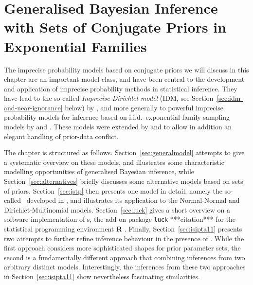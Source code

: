 \chapter{Generalised Bayesian Inference with Sets of Conjugate Priors in Exponential Families}
\label{cha:imprecisebayes-conjugate}

The imprecise probability models based on conjugate priors we will discuss in this chapter
are an important model class,
and have been central to the development and application of imprecise probability methods
in statistical inference.
They have lead to the so-called \emph{Imprecise Dirichlet model} (IDM, see Section~\ref{sec:idm-and-near-ignorance} below)
by \textcite{1996:walley::idm}, %
and more generally to powerful imprecise probability models for inference
based on i.i.d.\ exponential family sampling models by \textcite{2005:quaeghebeurcooman} and \textcite{2009:quaeghebeur::phd}.
These models were extended by \textcite[see Section~\ref{sec:jstp}]{Walter2009a} and \textcite[see Section~\ref{sec:isipta11}]{Walter2011a}
to allow in addition an elegant handling of prior-data conflict.

\medskip

The chapter is structured as follows.
Section~\ref{sec:generalmodel} attempts to give a systematic overview on these models, %
and illustrates some characteristic modelling opportunities of generalised Bayesian inference, while
Section~\ref{sec:alternatives} briefly discusses some alternative models based on sets of priors.
Section~\ref{sec:jstp} then presents one model in detail, namely the so-called
\nymodel\ developed in \textcite{Walter2009a},
and illustrates its application to the Normal-Normal and Dirichlet-Multinomial models. %
Section~\ref{sec:luck} gives a short overview on a software implementation of \nymodel s,
the add-on package \texttt{luck} ***citation*** for the statistical programming environment \textbf{R} \parencite{2013:r}.
Finally,
Section~\ref{sec:isipta11} presents two attempts to further refine inference behaviour in the presence of \pdc.
While the first approach considers more sophisticated shapes for prior parameter sets,
the second is a fundamentally different approach that combining inferences from two arbitrary distinct models.
Interestingly, the inferences from these two approaches in Section~\ref{sec:isipta11} show nevertheless fascinating similarities.


